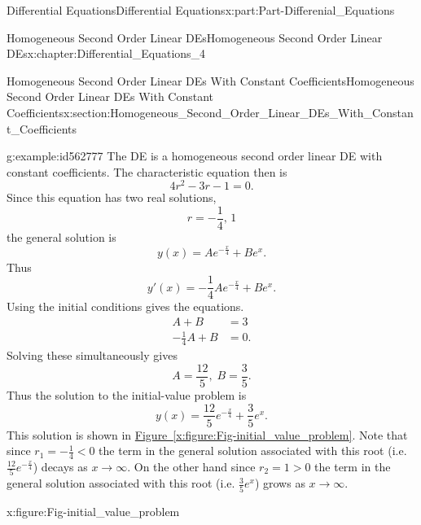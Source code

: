 \documentclass[oneside,10pt,]{book}
\newcommand{\xreffont}{\relax}
\numberwithin{equation}{section}
\newcommand{\amp}{&}
\begin{document}
\begin{partptx}{Differential Equations}{}{Differential Equations}{}{}{x:part:Part-Differenial_Equations}
\begin{chapterptx}{Homogeneous Second Order Linear DEs}{}{Homogeneous Second Order Linear DEs}{}{}{x:chapter:Differential_Equations_4}
\begin{sectionptx}{Homogeneous Second Order Linear DEs With Constant Coefficients}{}{Homogeneous Second Order Linear DEs With Constant Coefficients}{}{}{x:section:Homogeneous_Second_Order_Linear_DEs_With_Constant_Coefficients}
\begin{example}{}{g:example:id562777}
The DE is a homogeneous second order linear DE with constant coefficients. The characteristic equation then is%
\begin{equation*}
4r^{2}-3r-1=0.
\end{equation*}
Since this equation has two real solutions,%
\begin{equation*}
r=-\frac{1}{4},\, 1
\end{equation*}
the general solution is%
%
\begin{equation*}
y(x) = A e^{-\frac{x}{4}} + B e^{x}.
\end{equation*}
Thus%
\begin{equation*}
y'(x) = -\frac{1}{4} A e^{-\frac{x}{4}} + B e^{x}.
\end{equation*}
Using the initial conditions gives the equations.%
\begin{align*}
A + B \amp = 3  \\
-\frac{1}{4} A + B \amp = 0. 
\end{align*}
Solving these simultaneously gives%
\begin{equation*}
A=\frac{12}{5},\; B=\frac{3}{5}.
\end{equation*}
Thus the solution to the initial-value problem is%
\begin{equation*}
y(x) = \frac{12}{5} e^{-\frac{x}{4}} + \frac{3}{5} e^{x}.
\end{equation*}
This solution is shown in \hyperref[x:figure:Fig-initial_value_problem]{Figure~{\xreffont\ref{x:figure:Fig-initial_value_problem}}}. Note that since \(r_{1}=-\frac{1}{4} < 0 \) the term in the general solution associated with this root (i.e. \(\frac{12}{5} e^{-\frac{x}{4}} \)) decays as \(x\to \infty. \) On the other hand since \(r_{2}=1 > 0 \) the term in the general solution associated with this root (i.e. \(\frac{3}{5} e^{x} \)) grows as \(x\to \infty. \)%
\begin{figureptx}{}{x:figure:Fig-initial_value_problem}{}%
\begin{image}{0.075}{0.85}{0.075}%

\end{image}
\end{figureptx}
\end{example}
\end{sectionptx}
\end{chapterptx}
\end{partptx}
\end{document}
